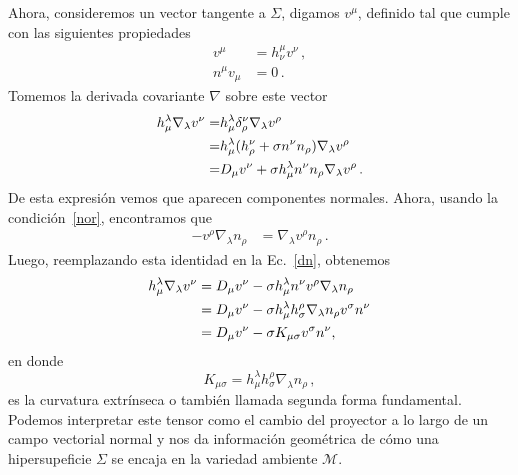 \documentclass[../Main.tex]{subfiles}
\begin{document}
Ahora, consideremos un vector tangente a $\Sigma$, digamos $v^{\mu}$, definido tal que cumple con las siguientes propiedades
\begin{align}\label{tan}
v^{\mu}&=h^{\mu}_{\nu}v^{\nu} \, , \\ 
n^{\mu}v_{\mu}&=0 \label{nor} \, .
\end{align}
Tomemos la derivada covariante $\nabla$ sobre este vector
\begin{align} \notag h^{\lambda}_{\mu}\nabla_{\lambda}v^{\nu}=&h^{\lambda}_{\mu}\delta^{\nu}_{\rho}\nabla_{\lambda}v^{\rho}\\ \notag
    =&h^{\lambda}_{\mu}(h^{\nu}_{\rho}+\sigma n^{\nu}n_{\rho})\nabla_{\lambda}v^{\rho}\\
    =&D_{\mu}v^{\nu}+\sigma h^{\lambda}_{\mu}n^{\nu}n_{\rho}\nabla_{\lambda}v^{\rho} \, . \label{dn}
\end{align}
De esta expresión vemos que aparecen componentes normales. Ahora, usando la condición~\eqref{nor}, encontramos que
\begin{align}
-v^{\rho}\nabla_{\lambda}n_{\rho}&=\nabla_{\lambda}v^{\rho}n_{\rho} \, .
\end{align}
Luego, reemplazando esta identidad en la Ec.~\eqref{dn}, obtenemos  
\begin{align} \notag
h^{\lambda}_{\mu}\nabla_{\lambda}v^{\nu}&=D_{\mu}v^{\nu}-\sigma h^{\lambda}_{\mu}n^{\nu}v^{\rho}\nabla_{\lambda}n_{\rho}\\ \notag
&=D_{\mu}v^{\nu}-\sigma h^{\lambda}_{\mu}h^{\rho}_{\sigma}\nabla_{\lambda}n_{\rho}v^{\sigma}n^{\nu}\\
&=D_{\mu}v^{\nu}-\sigma K_{\mu\sigma}v^{\sigma}n^{\nu},
\end{align}
en donde
\begin{equation}
K_{\mu\sigma}=h^{\lambda}_{\mu}h^{\rho}_{\sigma}\nabla_{\lambda}n_{\rho} \, ,
\end{equation}
es la curvatura extrínseca o también llamada segunda forma fundamental. Podemos interpretar este tensor como el cambio del proyector a lo largo de un campo vectorial normal y nos da información geométrica de cómo una hipersupeficie $\Sigma$ se encaja en la variedad ambiente $\mathcal{M}$.
\end{document}
